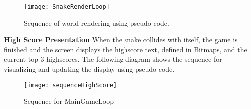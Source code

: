 		\begin{figure}[H]
			\texttt{[image: SnakeRenderLoop]}
			\centering
			\caption{Sequence of world rendering using pseudo-code.}
			\label{SnakeRenderLoop}
		\end{figure}
	
	\textbf{High Score Presentation} \newline
		When the snake collides with itself, the game is finished and the screen displays the highscore text, defined in Bitmaps, and the current top 3 highscores. The following diagram shows the sequence for visualizing and updating the display using pseudo-code.
		
			\begin{figure}[H]
				\texttt{[image: sequenceHighScore]}
				\centering
				\caption{Sequence for MainGameLoop}
				\label{fig:classMain}
			\end{figure}
		




